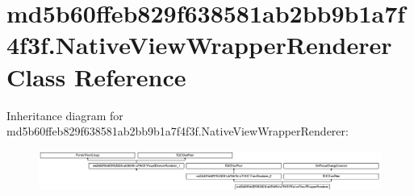 \hypertarget{classmd5b60ffeb829f638581ab2bb9b1a7f4f3f_1_1NativeViewWrapperRenderer}{}\section{md5b60ffeb829f638581ab2bb9b1a7f4f3f.\+Native\+View\+Wrapper\+Renderer Class Reference}
\label{classmd5b60ffeb829f638581ab2bb9b1a7f4f3f_1_1NativeViewWrapperRenderer}
Inheritance diagram for md5b60ffeb829f638581ab2bb9b1a7f4f3f.\+Native\+View\+Wrapper\+Renderer\+:\begin{figure}[H]
\begin{center}
\leavevmode
\includegraphics[height=1.336515cm]{classmd5b60ffeb829f638581ab2bb9b1a7f4f3f_1_1NativeViewWrapperRenderer}
\end{center}
\end{figure}
